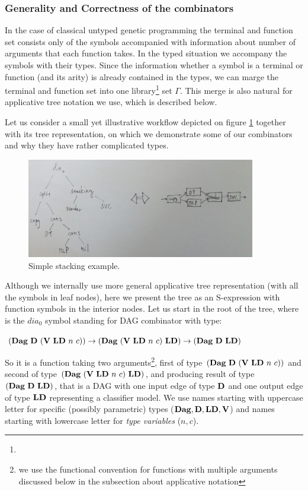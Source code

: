 \documentclass[a4paper,oneside]{memoir}
\begin{document}
\subsubsection{Generality and Correctness of the combinators}

In the case of classical untyped genetic programming the terminal and function set consists only of the symbols accompanied with information about number of arguments that each function takes. In the typed situation we accompany the symbols with their types. Since the information whether a symbol is a terminal or function (and its arity) is already contained in the types, we can marge the terminal and function set into one library\footnote{} set $\Gamma$. This merge is also natural for applicative tree notation we use, which is described below.  

Let us consider a small yet illustrative workflow depicted on figure \ref{simple_stacking} together with its tree representation, on which we demonstrate some of our combinators and why they have rather complicated types.

\begin{figure}[th]
\centerline{\includegraphics[width=10cm]{simple_stacking.jpg}}
\vspace*{8pt}
\caption{Simple stacking example.}
\label{simple_stacking}
\end{figure}

Although we internally use more general applicative tree representation (with all the symbols in leaf nodes),
here we present the tree as an S-expression with function symbols in the interior nodes.
Let us start in the root of the tree, where is the $dia_0$ symbol standing for DAG combinator with type:
 
$(\textbf{Dag}\ \textbf{D}\ (\textbf{V}\ \textbf{LD}\ n\ c)) \rightarrow (\textbf{Dag}\ (\textbf{V}\ \textbf{LD}\ n\ c)\ \textbf{LD}) \rightarrow (\textbf{Dag}\ \textbf{D}\ \textbf{LD})$
  
So it is a function taking two arguments\footnote{we use the functional convention for functions with multiple arguments discussed below in the subsection about applicative notation}, 
first of type $(\textbf{Dag}\ \textbf{D}\ (\textbf{V}\ \textbf{LD}\ n\ c))$ and second of type $(\textbf{Dag}\ (\textbf{V}\ \textbf{LD}\ n\ c)\ \textbf{LD})$, 
and producing result of type $(\textbf{Dag}\ \textbf{D}\ \textbf{LD})$, that is a DAG with one input edge of type $\textbf{D}$ and one output edge of type $\textbf{LD}$ representing a classifier model.
We use names starting with uppercase letter for specific (possibly parametric) types ($\textbf{Dag}, \textbf{D}, \textbf{LD}, \textbf{V}$) 
and names starting with lowercase letter for \textit{type variables} ($n, c$).
\end{document}

